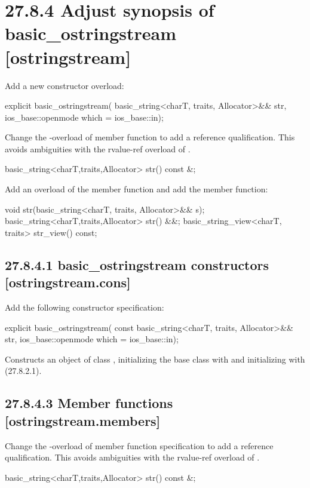 \documentclass[ebook,11pt,article]{memoir}
\begin{document}

\section{27.8.4 Adjust synopsis of basic\_ostringstream [ostringstream]}
Add a new constructor overload:
\begin{codeblock}
           explicit basic_ostringstream(
             basic_string<charT, traits, Allocator>&& str,
             ios_base::openmode which = ios_base::in);
\end{codeblock}

Change the -overload of  member function to add a reference qualification. This avoids ambiguities with the rvalue-ref overload of .  
\begin{codeblock}
basic_string<charT,traits,Allocator> str() const &;
\end{codeblock}


Add an overload of the  member function and add the  member function:
\begin{codeblock}
void str(basic_string<charT, traits, Allocator>&& s);
basic_string<charT,traits,Allocator> str() &&;
basic_string_view<charT, traits> str_view() const;
\end{codeblock}

\subsection{27.8.4.1 basic\_ostringstream constructors [ostringstream.cons]}
Add the following constructor specification:
\begin{itemdecl}
explicit basic_ostringstream(
  const basic_string<charT, traits, Allocator>&& str,
  ios_base::openmode which = ios_base::in);
\end{itemdecl}
\begin{itemdescr}
\pnum
\effects Constructs an object of class , initializing the base class with  and initializing  with  (27.8.2.1).
\end{itemdescr}
\subsection{27.8.4.3 Member functions [ostringstream.members]}
Change the -overload of  member function specification to add a reference qualification. This avoids ambiguities with the rvalue-ref overload of .  
\begin{codeblock}
basic_string<charT,traits,Allocator> str() const &;
\end{codeblock}
\end{document}
